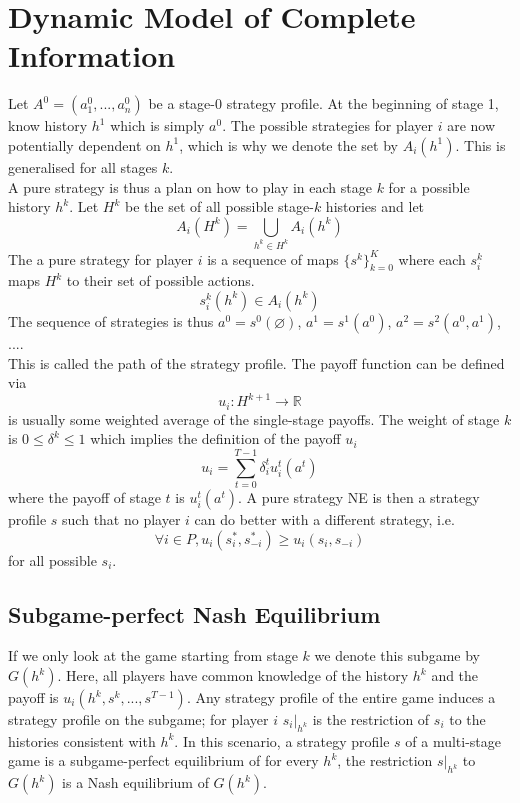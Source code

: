 \documentclass[a4paper, 12pt]{article}
\theoremstyle{plain}
\theoremstyle{definition}
\theoremstyle{lemma}
\theoremstyle{remark}
\theoremstyle{corollary}
\theoremstyle{example}
\begin{document}
	\section{Dynamic Model of Complete Information}
	Let $A^0 = (a_1^0,...,a_n^0)$ be a stage-0 strategy profile. At the beginning of stage 1, know history $h^1$ which is simply $a^0$. The possible strategies for player $i$ are now potentially dependent on $h^1$, which is why we denote the set by $A_i(h^1)$. This is generalised for all stages $k$.\\
	A pure strategy is thus a plan on how to play in each stage $k$ for a possible history $h^k$. Let $H^k$ be the set of all possible stage-$k$ histories and let \[A_i(H^k) = \bigcup_{h^k \in H^k} A_i(h^k)\]
	The a pure strategy for player $i$ is a sequence of maps $\{s^k\}_{k=0}^K$ where each $s_i^k$ maps $H^k$ to their set of possible actions. \[s_i^k(h^k) \in A_i(h^k)\]
	The sequence of strategies is thus $a^0 = s^0(\varnothing)$, $a^1 = s^1(a^0)$, $a^2 = s^2(a^0,a^1)$, ....\\
	This is called the path of the strategy profile. The payoff function can be defined via \[u_i: H^{k+1} \to \mathbb{R}\] is usually some weighted average of the single-stage payoffs. The weight of stage $k$ is $0 \leq \delta^k \leq 1$ which implies the definition of the payoff $u_i$ \[u_i = \sum_{t=0}^{T-1} \delta_i^t u_i^t(a^t)\] where the payoff of stage $t$ is $u_i^t(a^t)$. A pure strategy NE is then a strategy profile $s$ such that no player $i$ can do better with a different strategy, i.e. \[\forall i \in P, u_i(s_i^*,s_{-i}^*) \geq u_i(s_i,s_{-i})\] for all possible $s_i$.
	\subsection{Subgame-perfect Nash Equilibrium}
	If we only look at the game starting from stage $k$ we denote this subgame by $G(h^k)$. Here, all players have common knowledge of the history $h^k$ and the payoff is $u_i(h^k,s^k,...,s^{T-1})$. Any strategy profile of the entire game induces a strategy profile on the subgame; for player $i$ $s_i|_{h^k}$ is the restriction of $s_i$ to the histories consistent with $h^k$. In this scenario, a strategy profile $s$ of a multi-stage game is a subgame-perfect equilibrium of for every $h^k$, the restriction $s|_{h^k}$ to $G(h^k)$ is a Nash equilibrium of $G(h^k)$.
\end{document}
